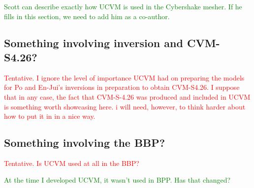 \textcolor{green}{Scott can describe exactly how UCVM is used in the Cybershake mesher. If he fills in this section, we need to add him as a co-author.}

\subsection{Something involving inversion and CVM-S4.26?}

\textcolor{red}{Tentative. I ignore the level of importance UCVM had on preparing the models for Po and En-Jui's inversions in preparation to obtain CVM-S4.26. I suppose that in any case, the fact that CVM-S-4.26 was produced and included in UCVM is something worth showcasing here. i will need, however, to think harder about how to put it in in a nice way.}

\subsection{Something involving the BBP?}

\textcolor{red}{Tentative. Is UCVM used at all in the BBP?}

\textcolor{green}{At the time I developed UCVM, it wasn't used in BPP. Has that changed?}
